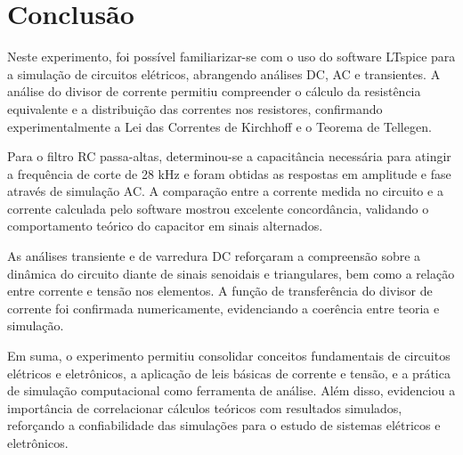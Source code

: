 \documentclass[10pt,twocolumn,letterpaper]{article}
\begin{document}
\section{Conclusão}

Neste experimento, foi possível familiarizar-se com o uso do software LTspice para a simulação de circuitos elétricos, abrangendo análises DC, AC e transientes. A análise do divisor de corrente permitiu compreender o cálculo da resistência equivalente e a distribuição das correntes nos resistores, confirmando experimentalmente a Lei das Correntes de Kirchhoff e o Teorema de Tellegen.

Para o filtro RC passa-altas, determinou-se a capacitância necessária para atingir a frequência de corte de 28 kHz e foram obtidas as respostas em amplitude e fase através de simulação AC. A comparação entre a corrente medida no circuito e a corrente calculada pelo software mostrou excelente concordância, validando o comportamento teórico do capacitor em sinais alternados.

As análises transiente e de varredura DC reforçaram a compreensão sobre a dinâmica do circuito diante de sinais senoidais e triangulares, bem como a relação entre corrente e tensão nos elementos. A função de transferência do divisor de corrente foi confirmada numericamente, evidenciando a coerência entre teoria e simulação.


Em suma, o experimento permitiu consolidar conceitos fundamentais de circuitos elétricos e eletrônicos, a aplicação de leis básicas de corrente e tensão, e a prática de simulação computacional como ferramenta de análise. Além disso, evidenciou a importância de correlacionar cálculos teóricos com resultados simulados, reforçando a confiabilidade das simulações para o estudo de sistemas elétricos e eletrônicos.

{\small


}
\end{document}
